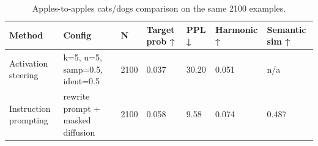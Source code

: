\begin{table}[t]
\centering
\small
\begin{tabular}{lllllll}
\toprule
Method & Config & N & Target prob ↑ & PPL ↓ & Harmonic ↑ & Semantic sim ↑ \\
\midrule
Activation steering & k=5, u=5, samp=0.5, ident=0.5 & 2100 & 0.037 & 30.20 & 0.051 & n/a \\
Instruction prompting & rewrite prompt + masked diffusion & 2100 & 0.058 & 9.58 & 0.074 & 0.487 \\
\bottomrule
\end{tabular}
\caption{Apples-to-apples cats/dogs comparison on the same 2100 examples.}
\label{tab:steering-vs-prompting}
\end{table}
